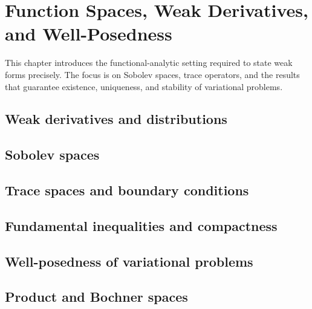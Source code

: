 \chapter{Function Spaces, Weak Derivatives, and Well-Posedness}
\label{ch:function_spaces}

This chapter introduces the functional-analytic setting required to state weak
forms precisely. The focus is on Sobolev spaces, trace operators, and the
results that guarantee existence, uniqueness, and stability of variational
problems.

\section{Weak derivatives and distributions}
\label{sec:function_spaces:weak_derivatives}


\section{Sobolev spaces}
\label{sec:function_spaces:sobolev}


\section{Trace spaces and boundary conditions}
\label{sec:function_spaces:trace}


\section{Fundamental inequalities and compactness}
\label{sec:function_spaces:inequalities}


\section{Well-posedness of variational problems}
\label{sec:function_spaces:well_posedness}


\section{Product and Bochner spaces}
\label{sec:function_spaces:product_bochner}

